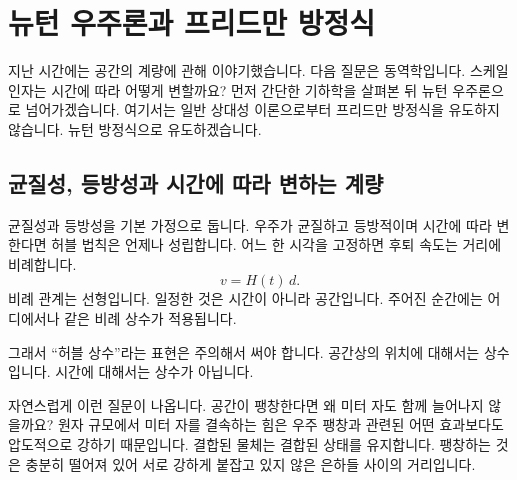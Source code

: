 \chapter{뉴턴 우주론과 프리드만 방정식}

지난 시간에는 공간의 계량에 관해 이야기했습니다. 다음 질문은 동역학입니다. 스케일 인자는 시간에 따라 어떻게 변할까요? 먼저 간단한 기하학을 살펴본 뒤 뉴턴 우주론으로 넘어가겠습니다. 여기서는 일반 상대성 이론으로부터 프리드만 방정식을 유도하지 않습니다. 뉴턴 방정식으로 유도하겠습니다.

\section{균질성, 등방성과 시간에 따라 변하는 계량}

균질성과 등방성을 기본 가정으로 둡니다. 우주가 균질하고 등방적이며 시간에 따라 변한다면 허블 법칙은 언제나 성립합니다. 어느 한 시각을 고정하면 후퇴 속도는 거리에 비례합니다.
\begin{equation}
v = H(t)\,d.
\end{equation}
비례 관계는 선형입니다. 일정한 것은 시간이 아니라 공간입니다. 주어진 순간에는 어디에서나 같은 비례 상수가 적용됩니다.

\begin{classroomqa}
\end{classroomqa}

그래서 ``허블 상수''라는 표현은 주의해서 써야 합니다. 공간상의 위치에 대해서는 상수입니다. 시간에 대해서는 상수가 아닙니다.

자연스럽게 이런 질문이 나옵니다. 공간이 팽창한다면 왜 미터 자도 함께 늘어나지 않을까요? 원자 규모에서 미터 자를 결속하는 힘은 우주 팽창과 관련된 어떤 효과보다도 압도적으로 강하기 때문입니다. 결합된 물체는 결합된 상태를 유지합니다. 팽창하는 것은 충분히 떨어져 있어 서로 강하게 붙잡고 있지 않은 은하들 사이의 거리입니다.

\begin{classroomqa}
\end{classroomqa}

